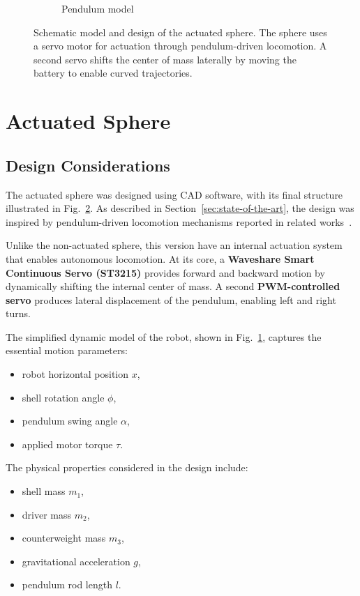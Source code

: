 \documentclass[english, bachelor, utf8]{base/thesis_telematics}
\begin{document}
\begin{figure}[ht]
\begin{subfigure}{0.52\columnwidth}
    \caption{Pendulum model~\cite{Sphere_2D}}
    \label{fig:2d-model2}
\end{subfigure}
\caption{Schematic model and design of the actuated sphere.
The sphere uses a servo motor for actuation through pendulum-driven locomotion.
A second servo shifts the center of mass laterally by moving the battery to enable curved trajectories.}
\label{fig:act-cad-design2}
\end{figure}
\section{Actuated Sphere}
\subsection{Design Considerations}
The actuated sphere was designed using CAD software, with its final structure illustrated in Fig.~\ref{fig:act-cad-design2}. As described in Section~\ref{sec:state-of-the-art}, the design was inspired by pendulum-driven locomotion mechanisms reported in related works~\cite{roboball, novelsphere}.  

Unlike the non-actuated sphere, this version have an internal actuation system that enables autonomous locomotion.
At its core, a \textbf{Waveshare Smart Continuous Servo (ST3215)} provides forward and backward motion by dynamically shifting the internal center of mass. 
A second \textbf{PWM-controlled servo} produces lateral displacement of the pendulum, enabling left and right turns.  



The simplified dynamic model of the robot, shown in Fig.~\ref{fig:2d-model2}, captures the essential motion parameters:  
\begin{itemize}
    \item robot horizontal position \( x \),  
    \item shell rotation angle \( \phi \),  
    \item pendulum swing angle \( \alpha \),  
    \item applied motor torque \( \tau \).  
\end{itemize}

The physical properties considered in the design include:  
\begin{itemize}
    \item shell mass \( m_1 \),  
    \item driver mass \( m_2 \),  
    \item counterweight mass \( m_3 \),  
    \item gravitational acceleration \( g \),  
    \item pendulum rod length \( l \).  
\end{itemize}
\end{document}
